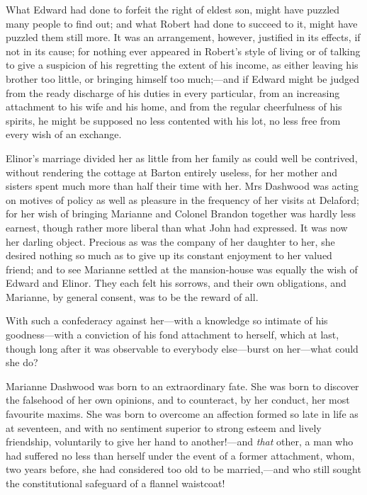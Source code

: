 What Edward had done to forfeit the right of eldest son, might have puzzled many people to find out; and what Robert had done to succeed to it, might have puzzled them still more. It was an arrangement, however, justified in its effects, if not in its cause; for nothing ever appeared in Robert’s style of living or of talking to give a suspicion of his regretting the extent of his income, as either leaving his brother too little, or bringing himself too much;—and if Edward might be judged from the ready discharge of his duties in every particular, from an increasing attachment to his wife and his home, and from the regular cheerfulness of his spirits, he might be supposed no less contented with his lot, no less free from every wish of an exchange.

Elinor’s marriage divided her as little from her family as could well be contrived, without rendering the cottage at Barton entirely useless, for her mother and sisters spent much more than half their time with her. Mrs Dashwood was acting on motives of policy as well as pleasure in the frequency of her visits at Delaford; for her wish of bringing Marianne and Colonel Brandon together was hardly less earnest, though rather more liberal than what John had expressed. It was now her darling object. Precious as was the company of her daughter to her, she desired nothing so much as to give up its constant enjoyment to her valued friend; and to see Marianne settled at the mansion-house was equally the wish of Edward and Elinor. They each felt his sorrows, and their own obligations, and Marianne, by general consent, was to be the reward of all.

With such a confederacy against her—with a knowledge so intimate of his goodness—with a conviction of his fond attachment to herself, which at last, though long after it was observable to everybody else—burst on her—what could she do?

Marianne Dashwood was born to an extraordinary fate. She was born to discover the falsehood of her own opinions, and to counteract, by her conduct, her most favourite maxims. She was born to overcome an affection formed so late in life as at seventeen, and with no sentiment superior to strong esteem and lively friendship, voluntarily to give her hand to another!—and \textit{that} other, a man who had suffered no less than herself under the event of a former attachment, whom, two years before, she had considered too old to be married,—and who still sought the constitutional safeguard of a flannel waistcoat!

